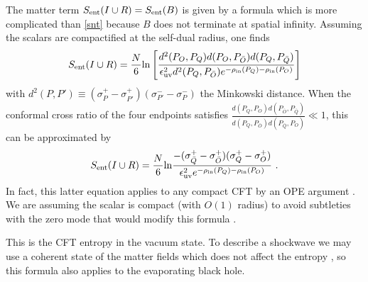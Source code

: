 \documentclass[11pt,oneside,letterpaper]{article}
\newcommand{\be}{\begin{equation}}
\newcommand{\ee}{\end{equation}}
\def\be{\begin{eqnarray}}
\def\ee{\end{eqnarray}}
\let\s=\sigma \let\t=\tau \let\u=\upsilon \let\c=\chi
\def\be{\begin{equation}}
\def\ee{\end{equation}}
\def\euv{\epsilon_{\rm uv}}
\def\log{{\rm ln}}
\numberwithin{equation}{section}
\def \be {\begin{equation}}
\def \ee {\end{equation}}
\begin{document}
The matter term $S_{\rm ent }({I \cup R})=S_{\rm ent }(B)$ is given by a formula which is more complicated than \eqref{snt} because $B$ does not terminate at spatial infinity. Assuming the scalars are compactified at the self-dual radius, one finds \cite{Calabrese:2009ez}
\be\label{sdboson}
S_{\rm ent}(I \cup R)  = \frac{N}{6}\log\left[ 
\frac{
d^2(P_O,P_Q) d(P_O, P_{{\bar{O}}}) d(P_Q, P_{\bar{Q}}) }{
 \euv^2 
 d^2(P_Q, P_{\bar{O}})
 e^{-\rho_{\rm in}(P_Q) - \rho_{\rm in}(P_O)}
 }
 \right]
\ee
with $d^2(P,P') \equiv (\sigma_P^+ - \sigma_{P'}^+)(\sigma_{P'}^- - \sigma_{P}^-)$ the Minkowski distance. When the conformal cross ratio of the four endpoints satisfies $\frac{d(P_Q, P_O)d(P_{\bar{O}}, P_{\bar{Q}})}{d(P_Q, P_{\bar{O}}) d(P_{\bar{Q}}, P_O)} \ll 1$, this can be approximated by
\be\label{holoS}
S_{\rm ent}(I\cup R) = \frac{N}{6}\log  \frac{ - (\s^+_{\bar Q}  - \s^+_{\bar O} )(\s^+_{Q}  - \s^+_{O} ) }{\euv ^2 e^{-\rho_{\rm in}(P_Q) - \rho_{\rm in}(P_O) } } \ .
\ee
In fact, this latter equation applies to any compact CFT by an OPE argument \cite{Calabrese:2009qy}. We are assuming the scalar is compact (with $O(1)$ radius) to avoid subtleties with the zero mode that would modify this formula \cite{Fiola:1994ir,Calabrese:2009ez}.


This is the CFT entropy in the vacuum state. To describe a  shockwave we may use  a coherent state of the matter fields which does not affect the entropy \cite{Fiola:1994ir}, so this formula also applies to the evaporating black hole.
\end{document}
